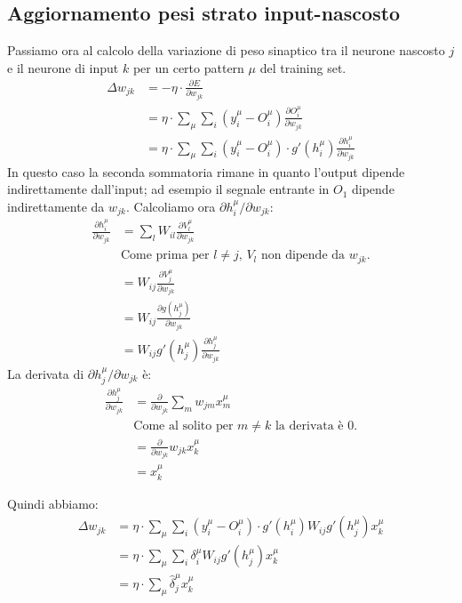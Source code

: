\subsection{Aggiornamento pesi strato input-nascosto} %
\label{sub:aggiornamento_pesi_strato_input_nascosto}
Passiamo ora al calcolo della variazione di peso sinaptico tra il neurone nascosto $j$ e il neurone di input $k$ per un certo pattern $\mu$ del training set.
\begin{align*}
    \Delta w_{jk} &= - \eta \cdot \frac{\partial E}{\partial w_{jk}} \\
    &= \eta \cdot \sum_\mu \sum_i (y^\mu_i - O^\mu_i)  \frac{\partial O^\mu_i}{\partial w_{jk}} \\
    &= \eta \cdot \sum_\mu \sum_i (y^\mu_i - O^\mu_i) \cdot   g'(h^\mu_i) \frac{\partial h^\mu_i}{\partial w_{jk}}
\end{align*}
In questo caso la seconda sommatoria rimane in quanto l'output dipende indirettamente dall'input; ad esempio il segnale entrante in $O_1$ dipende indirettamente da $w_{jk}$.
Calcoliamo ora $\partial h^\mu_i / \partial w_{jk}$:
\begin{align*}
    \frac{\partial h^\mu_i}{\partial w_{jk}} &= \sum_l W_{il} \frac{\partial V_l^\mu}{\partial w_{jk}} \\
    &\text{Come prima per $l\neq j$, $V_l$ non dipende da $w_{jk}$.} \\
    &= W_{ij} \frac{\partial V_j^\mu}{\partial w_{jk}} \\
    &= W_{ij} \frac{\partial g(h^\mu_j)}{\partial w_{jk}} \\
    &= W_{ij} g'(h^\mu_j) \frac{\partial h^\mu_j}{\partial w_{jk}}
\end{align*}
La derivata di $\partial h^\mu_j / \partial w_{jk}$ è:
\begin{align*}
	\frac{\partial h^\mu_j}{\partial w_{jk}} 
	&= \frac{\partial}{\partial w_{jk}} \sum_m w_{jm} x^\mu_m \\
	&\text{Come al solito per $m \neq k$ la derivata è 0.} \\
	&= \frac{\partial}{\partial w_{jk}} w_{jk} x^\mu_k\\
	&= x^\mu_k
\end{align*}

\newpage

Quindi abbiamo:
\begin{align*}
    \Delta w_{jk} &= \eta \cdot \sum_\mu \sum_i (y_i^\mu - O^\mu_i) \cdot g'(h^\mu_i) W_{ij} g'(h_j^\mu) x^\mu_k\\
    &= \eta \cdot \sum_\mu \sum_i \delta_i^\mu W_{ij} g'(h_j^\mu) x^\mu_k \\
    &= \eta \cdot \sum_\mu \hat{\delta}_j^\mu x^\mu_k
\end{align*}

